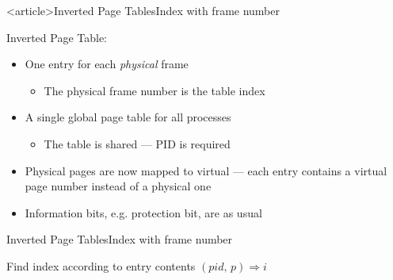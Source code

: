 \begin{frame}<article>{Inverted Page Tables}{Index with frame number}
  \begin{iblock}{Inverted Page Table:}
    \begin{itemize}
    \item One entry for each \emph{physical} frame
      \begin{itemize}
      \item The physical frame number is the table index
      \end{itemize}
    \item A single global page table for all processes
      \begin{itemize}
      \item The table is shared --- PID is required
      \end{itemize}
    \end{itemize}
  \end{iblock}
  \begin{itemize}
  \item Physical pages are now mapped to virtual --- each entry contains a virtual page
    number instead of a physical one
  \item Information bits, e.g. protection bit, are as usual
  \end{itemize}
\end{frame}

\begin{frame}{Inverted Page Tables}{Index with frame number}
  \begin{iblock}{Find index according to entry contents}
    $(pid,\,p)\Rightarrow{}i$
    \begin{center}
    \end{center}
  \end{iblock}
\end{frame}

